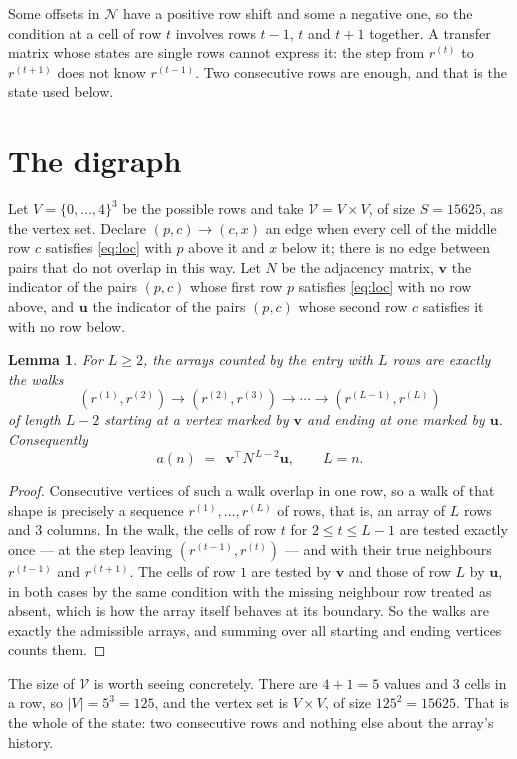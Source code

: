 \documentclass[11pt,a4paper]{article}
\theoremstyle{plain}
\newtheorem{lemma}[theorem]{Lemma}
\theoremstyle{definition}
\begin{document}
Some offsets in $\mathcal N$ have a positive row shift and some a negative one, so the
condition at a cell of row $t$ involves rows $t-1$, $t$ and $t+1$ together. A transfer
matrix whose states are single rows cannot express it: the step from $r^{(t)}$ to
$r^{(t+1)}$ does not know $r^{(t-1)}$. Two consecutive rows are enough, and that is
the state used below.

\section{The digraph}

Let $V=\{0,\dots,4\}^{3}$ be the possible rows and take
$\mathcal V=V\times V$, of size $S=15625$, as the vertex set. Declare $(p,c)\to(c,x)$ an edge
when every cell of the middle row $c$ satisfies \eqref{eq:loc} with $p$ above it and $x$
below it; there is no edge between pairs that do not overlap in this way. Let $N$ be the
adjacency matrix, $\mathbf{v}$ the indicator of the pairs $(p,c)$ whose first row $p$
satisfies \eqref{eq:loc} with no row above, and $\mathbf{u}$ the indicator of
the pairs $(p,c)$ whose second row $c$ satisfies it with no row below.

\begin{lemma}\label{lem:walk}
For $L\ge2$, the arrays counted by the entry with $L$ rows are exactly the walks
\[
(r^{(1)},r^{(2)})\to(r^{(2)},r^{(3)})\to\cdots\to(r^{(L-1)},r^{(L)})
\]
of length $L-2$ starting at a vertex marked by $\mathbf{v}$ and ending at one marked by
$\mathbf{u}$. Consequently
\[
a(n)\;=\;\,\mathbf{v}^{\!\top}N^{\,L-2}\mathbf{u},\qquad L=n .
\]
\end{lemma}

\begin{proof}
Consecutive vertices of such a walk overlap in one row, so a walk of that shape is
precisely a sequence $r^{(1)},\dots,r^{(L)}$ of rows, that is, an array of $L$ rows
and $3$ columns. In the walk, the cells of row $t$ for $2\le t\le L-1$ are tested
exactly once --- at the step leaving $(r^{(t-1)},r^{(t)})$ --- and with their true
neighbours $r^{(t-1)}$ and $r^{(t+1)}$. The cells of row $1$ are tested by
$\mathbf{v}$ and those of row $L$ by $\mathbf{u}$, in both cases by the same condition
with the missing neighbour row treated as absent, which is how the array itself behaves at
its boundary. So the walks are exactly the admissible arrays, and summing over all starting
and ending vertices counts them.
\end{proof}


The size of $\mathcal V$ is worth seeing concretely. There are $4+1=5$ values
and $3$ cells in a row, so $|V|=5^{3}=125$, and the vertex set is
$V\times V$, of size $125^2=15625$. That is the whole of the state: two consecutive
rows and nothing else about the array's history.
\end{document}
